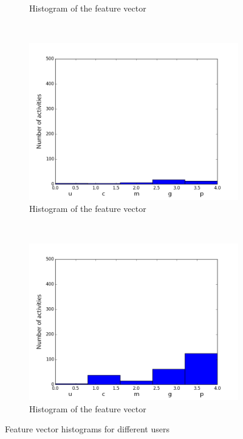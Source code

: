 \documentclass[11pt, oneside]{article}   	%
\begin{document}
\begin{figure}[!htb]
\begin{subfigure}[b]{0.45\textwidth}
                \caption{Histogram of the feature vector}
                \label{hist4}
        \end{subfigure}
        ~ %
        \begin{subfigure}[b]{0.45\textwidth}
                \includegraphics[width=\textwidth]{./hist5.png}
                \caption{Histogram of the feature vector}
                \label{hist5}
        \end{subfigure}
        ~ %
        \begin{subfigure}[b]{0.45\textwidth}
                \includegraphics[width=\textwidth]{./hist6.png}
                \caption{Histogram of the feature vector}
                \label{hist6}
        \end{subfigure}
	\caption{Feature vector histograms for different users}
	\label{figure:histogramForDifferentUsers}
\end{figure}
\end{document}
